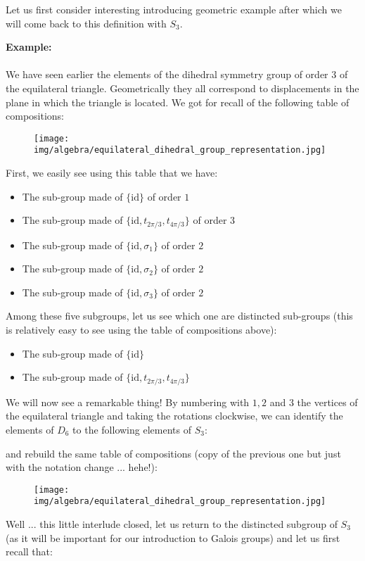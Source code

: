 	Let us first consider interesting introducing geometric example after which we will come back to this definition with $S_3$.
	\begin{tcolorbox}[colframe=black,colback=white,sharp corners]
	\textbf{{\Large {}}Example:}\\\\
	We have seen earlier the elements of the dihedral symmetry group of order $3$ of the equilateral triangle. Geometrically they all correspond to displacements in the plane in which the triangle is located. We got for recall of the following table of compositions:
	\begin{figure}[H]
		\centering
		\texttt{[image: img/algebra/equilateral\_dihedral\_group\_representation.jpg]}
	\end{figure}
	
	First, we easily see using this table that we have:
	\begin{itemize}
		\item The sub-group made of $\{\text{id}\}$ of order $1$
	
		\item The sub-group made of $\{\text{id},t_{2\pi/3},t_{4\pi/3}\}$ of order $3$

		\item The sub-group made of $\{\text{id},\sigma_1\}$ of order $2$

		\item The sub-group made of $\{\text{id},\sigma_2\}$ of order $2$

		\item The sub-group made of $\{\text{id},\sigma_3\}$ of order $2$
	\end{itemize}
	Among these five subgroups, let us see which one are distincted sub-groups  (this is relatively easy to see using the table of compositions above):
	\begin{itemize}
		\item The sub-group made of $\{\text{id}\}$
	
		\item The sub-group made of $\{\text{id},t_{2\pi/3},t_{4\pi/3}\}$ 
	\end{itemize}
	\end{tcolorbox}
	
	\pagebreak
	\begin{tcolorbox}[colframe=black,colback=white,sharp corners]
	We will now see a remarkable thing! By numbering with $1, 2$ and $3$ the vertices of the equilateral triangle and taking the rotations clockwise, we can identify the elements of $D_6$ to the following elements of $S_3$:
	
	and rebuild the same table of compositions (copy of the previous one but just with the notation change ... hehe!):
	\begin{figure}[H]
		\centering
		\texttt{[image: img/algebra/equilateral\_dihedral\_group\_representation.jpg]}
	\end{figure}
	
	\end{tcolorbox}
		Well ... this little interlude closed, let us return to the distincted subgroup of $S_3$ (as it will be important for our introduction to Galois groups) and let us first recall that:
	
